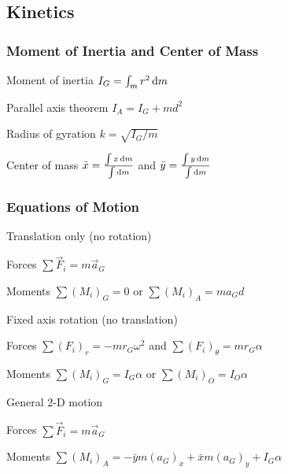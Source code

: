\documentclass{article}
\begin{document}
\subsection{Kinetics}
\label{sec:rigid-body-planar-kinetics}

\subsubsection{Moment of Inertia and Center of Mass}

\begin{description*}
\item[Moment of inertia]
  \(I_G = \int_m r^2 \dif{m}\)
\item[Parallel axis theorem]
  \(I_A = I_G + md^2\)
\item[Radius of gyration]
  \(k = \sqrt{I_G/m}\)
\item[Center of mass]
  \(\bar{x} = \frac{\int x \dif{m}}{\int \dif{m}}\) and
  \(\bar{y} = \frac{\int y \dif{m}}{\int \dif{m}}\)
\end{description*}

\subsubsection{Equations of Motion}
\label{sec:rigid-body-equations-of-motion}

\begin{description*}
\item[Translation only (no rotation)]~
  \begin{description*}
  \item[Forces]
    \(\sum \vec{F}_i = m\vec{a}_G\)
  \item[Moments]
    \(\sum (M_i)_G = 0\) or \(\sum (M_i)_A = ma_Gd\)
  \end{description*}
\item[Fixed axis rotation (no translation)]~
  \begin{description*}
  \item[Forces]
    \(\sum (F_i)_r = -m r_G \omega^2\) and
    \(\sum (F_i)_\theta = m r_G \alpha\)
  \item[Moments]
    \(\sum (M_i)_G = I_G \alpha\) or
    \(\sum (M_i)_O = I_O \alpha\)
  \end{description*}
\item[General 2-D motion]~
  \begin{description*}
  \item[Forces]
    \(\sum \vec{F}_i = m \vec{a}_G\)
  \item[Moments]
    \(\sum (M_i)_A = -\bar{y} m (a_G)_x + \bar{x} m (a_G)_y + I_G \alpha\)
  \end{description*}
\end{description*}
\end{document}
